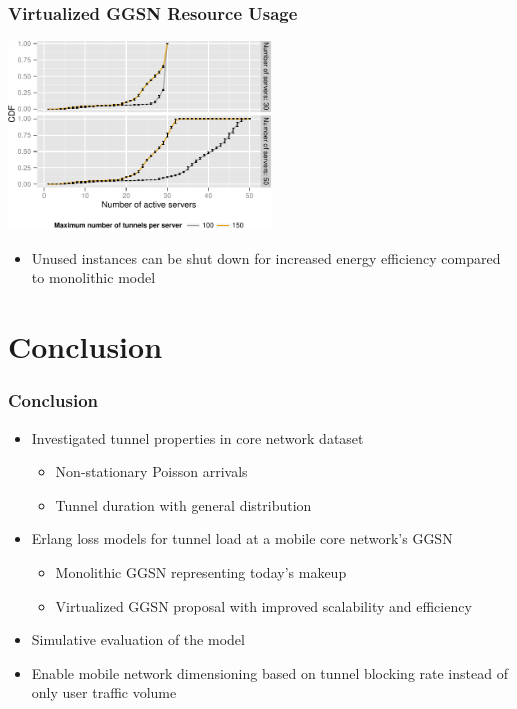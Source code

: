 \documentclass{beamer}
\begin{document}
\begin{frame}
	\frametitle{Virtualized GGSN Resource Usage}

	\begin{center}
		\includegraphics[height=5cm]{figures/instanceuse-multiserver.pdf}
	\end{center}

	\begin{itemize}
		\item Unused instances can be shut down for increased energy efficiency compared to monolithic model
	\end{itemize}
\end{frame}




\section{Conclusion}

\begin{frame}
	\frametitle{Conclusion}

	\begin{itemize}
		\item Investigated tunnel properties in core network dataset

		\begin{itemize}
			\item Non-stationary Poisson arrivals
			\item Tunnel duration with general distribution
		\end{itemize}

		\item Erlang loss models for tunnel load at a mobile core network's GGSN
		\begin{itemize}
			\item Monolithic GGSN representing today's makeup
			\item Virtualized GGSN proposal with improved scalability and efficiency
		\end{itemize}

		\item Simulative evaluation of the model

		\item Enable mobile network dimensioning based on tunnel blocking rate instead of only user traffic volume


	\end{itemize}

\end{frame}
\end{document}
